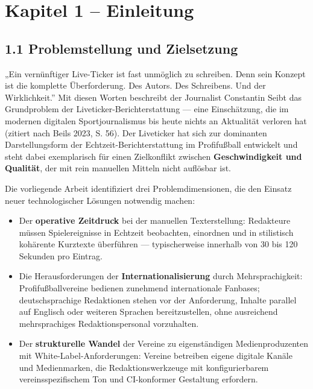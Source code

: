 \section{Kapitel 1 -- Einleitung}\label{kapitel-1-einleitung}

\subsection{1.1 Problemstellung und
Zielsetzung}\label{problemstellung-und-zielsetzung}

„Ein vernünftiger Live-Ticker ist fast unmöglich zu schreiben. Denn sein
Konzept ist die komplette Überforderung. Des Autors. Des Schreibens. Und
der Wirklichkeit.'' Mit diesen Worten beschreibt der Journalist
Constantin Seibt das Grundproblem der Liveticker-Berichterstattung ---
eine Einschätzung, die im modernen digitalen Sportjournalismus bis heute
nichts an Aktualität verloren hat (zitiert nach Beils 2023, S. 56). Der
Liveticker hat sich zur dominanten Darstellungsform der
Echtzeit-Berichterstattung im Profifußball entwickelt und steht dabei
exemplarisch für einen Zielkonflikt zwischen \textbf{Geschwindigkeit und
Qualität}, der mit rein manuellen Mitteln nicht auflösbar ist.

Die vorliegende Arbeit identifiziert drei Problemdimensionen, die den
Einsatz neuer technologischer Lösungen notwendig machen:

\begin{itemize}
\tightlist
\item
  Der \textbf{operative Zeitdruck} bei der manuellen Texterstellung:
  Redakteure müssen Spielereignisse in Echtzeit beobachten, einordnen
  und in stilistisch kohärente Kurztexte überführen --- typischerweise
  innerhalb von 30 bis 120 Sekunden pro Eintrag.
\item
  Die Herausforderungen der \textbf{Internationalisierung} durch
  Mehrsprachigkeit: Profifußballvereine bedienen zunehmend
  internationale Fanbases; deutschsprachige Redaktionen stehen vor der
  Anforderung, Inhalte parallel auf Englisch oder weiteren Sprachen
  bereitzustellen, ohne ausreichend mehrsprachiges Redaktionspersonal
  vorzuhalten.
\item
  Der \textbf{strukturelle Wandel} der Vereine zu eigenständigen
  Medienproduzenten mit White-Label-Anforderungen: Vereine betreiben
  eigene digitale Kanäle und Medienmarken, die Redaktionswerkzeuge mit
  konfigurierbarem vereinsspezifischem Ton und CI-konformer Gestaltung
  erfordern.
\end{itemize}

